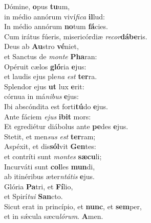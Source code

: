 \evenverse Dómine, \textbf{o}pus \textbf{tu}um,~\*\\
\evenverse in médio annórum viví\textit{fi}\textit{ca} \textbf{il}lud:\\
\oddverse In médio annórum \textbf{no}tum \textbf{fá}cies.~\*\\
\oddverse Cum irátus fúeris, misericórdiæ \textit{re}\textit{cor}\textbf{dá}\textbf{be}ris.\\
\evenverse Deus ab \textbf{Au}stro \textbf{vé}niet,~\*\\
\evenverse et Sanctus de \textit{mon}\textit{te} \textbf{Pha}ran:\\
\oddverse Opéruit cælos \textbf{gló}ria \textbf{e}jus:~\*\\
\oddverse et laudis ejus ple\textit{na} \textit{est} \textbf{ter}ra.\\
\evenverse Splendor ejus \textbf{ut} lux \textbf{e}rit:~\*\\
\evenverse córnua in má\textit{ni}\textit{bus} \textbf{e}jus:\\
\oddverse Ibi abscóndita est forti\textbf{tú}do \textbf{e}jus.~\*\\
\oddverse Ante fáciem \textit{e}\textit{jus} \textbf{i}\textbf{bit} mors:\\
\evenverse Et egrediétur diábolus ante \textbf{pe}des \textbf{e}jus.~\*\\
\evenverse Stetit, et men\textit{sus} \textit{est} \textbf{ter}ram;\\
\oddverse Aspéxit, et dis\textbf{sól}vit \textbf{Gen}tes:~\*\\
\oddverse et contríti sunt \textit{mon}\textit{tes} \textbf{sæ}\textbf{cu}li;\\
\evenverse Incurváti sunt \textbf{col}les \textbf{mun}di,~\*\\
\evenverse ab itinéribus æter\textit{ntá}\textit{tis} \textbf{e}jus.\\
\oddverse Glória \textbf{Pa}tri, et \textbf{Fí}lio,~\*\\
\oddverse et Spirí\textit{tu}\textit{i} \textbf{San}cto.\\
\evenverse Sicut erat in princípio, et \textbf{nunc}, et \textbf{sem}per,~\*\\
\evenverse et in sǽcula sæcu\textit{ló}\textit{rum}. \textbf{A}men.\\
